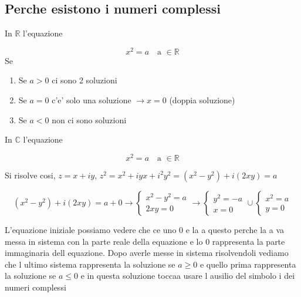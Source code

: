 \documentclass{article}
\begin{document}
          \subsection*{Perche esistono i numeri complessi}
          \begin{flushleft}
            In $\mathbb{R}$ l'equazione
          \end{flushleft}
          \begin{equation*}
            x^2=a \quad \text{a $\in \mathbb{R}$}
          \end{equation*}
          Se
          \begin{enumerate}
            \item Se $a>0$ ci sono 2 soluzioni
            \item Se $a=0$ c'e' solo una soluzione $\to x=0$ (doppia soluzione)
            \item Se $a<0$ non ci sono soluzioni
          \end{enumerate}
          \begin{flushleft}
            In $\mathbb{C}$ l'equazione
          \end{flushleft}
          \begin{equation*}
            x^2=a \quad \text{a $\in \mathbb{R}$}
          \end{equation*}
          \begin{flushleft}
            Si risolve cosi, $z=x+iy$, $z^2=x^2+iyx+i^2y^2=(x^2-y^2)+i(2xy)=a$
          \end{flushleft}
          \begin{equation*}
            (x^2-y^2)+i(2xy)=a+0 \to 
            \begin{cases}
              x^2-y^2=a  \\
              2xy=0
            \end{cases} \to 
            \begin{cases}
              y^2=-a \\
              x=0
            \end{cases} \cup 
            \begin{cases}
              x^2=a \\
              y=0
            \end{cases}
          \end{equation*}
          \begin{flushleft}
            L'equazione iniziale possiamo vedere che ce uno 0 e la a questo perche la a va messa in sistema con la parte reale della equazione e lo 0
            rappresenta la parte immaginaria dell equazione. Dopo averle messe in sistema risolvendoli vediamo che l ultimo sistema rappresenta
            la soluzione se $a\geq 0$ e quello prima rappresenta la soluzione se $a\leq 0$ e in questa soluzione toccaa usare l ausilio del simbolo i dei numeri complessi
          \end{flushleft}
          \begin{flushleft}
            
          \end{flushleft}
      
\end{document}
